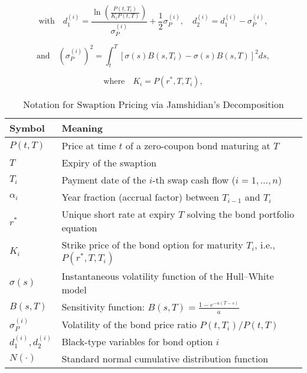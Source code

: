 \begin{equation}
	\text{with} \quad d_1^{(i)} = \frac{\ln\left( \frac{P(t, T_i)}{K_i P(t, T)} \right)}{\sigma_P^{(i)}} + \frac{1}{2} \sigma_P^{(i)}, \quad d_2^{(i)} = d_1^{(i)} - \sigma_P^{(i)},
\end{equation}

\begin{equation}
	\text{and} \quad \left( \sigma_P^{(i)} \right)^2 = \int_t^T \left[ \sigma(s) B(s, T_i) - \sigma(s) B(s, T) \right]^2 ds,
\end{equation}

\begin{equation}
	\text{where} \quad K_i = P(r^*, T, T_i),
\end{equation}

\begin{table}[H]
	\centering
	\caption{Notation for Swaption Pricing via Jamshidian's Decomposition}
	\begin{tabular}{ll}
		\toprule
		\textbf{Symbol}        & \textbf{Meaning}                                                           \\
		\midrule
		$P(t, T)$              & Price at time $t$ of a zero-coupon bond maturing at $T$                    \\
		$T$                    & Expiry of the swaption                                                     \\
		$T_i$                  & Payment date of the $i$-th swap cash flow ($i = 1, \dots, n$)              \\
		$\alpha_i$             & Year fraction (accrual factor) between $T_{i-1}$ and $T_i$                 \\
		$r^*$                  & Unique short rate at expiry $T$ solving the bond portfolio equation        \\
		$K_i$                  & Strike price of the bond option for maturity $T_i$, i.e., $P(r^*, T, T_i)$ \\
		$\sigma(s)$            & Instantaneous volatility function of the Hull–White model                  \\
		$B(s, T)$              & Sensitivity function: $B(s, T) = \frac{1 - e^{-a(T - s)}}{a}$              \\
		$\sigma_P^{(i)}$       & Volatility of the bond price ratio $P(t, T_i)/P(t, T)$                     \\
		$d_1^{(i)}, d_2^{(i)}$ & Black-type variables for bond option $i$                                   \\
		$N(\cdot)$             & Standard normal cumulative distribution function                           \\
		\bottomrule
	\end{tabular}
\end{table}

